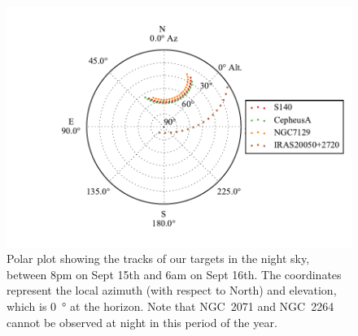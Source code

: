 \begin{figure}[!h]
	\centering
	\includegraphics[width=\textwidth]{Figures/TargetPlot.pdf}
	\caption[Targets]{Polar plot showing the tracks of our targets in the night sky, between 8pm on Sept 15th and 6am on Sept 16th. The coordinates represent the local azimuth (with respect to North) and elevation, which is \SI{0}{\degree} at the horizon. Note that NGC~2071 and NGC~2264 cannot be observed at night in this period of the year.}
	\label{fig:Targets}
    \end{figure}

